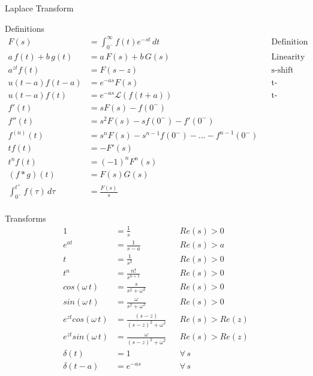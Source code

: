 %
%
%

\begin{section}{Laplace Transform}
  \begin{subsection}{Definitions}
    \begin{align*}
      F(s) &= \int_{0^-}^{\infty}f(t)e^{-st}\,dt  && \text{Definition}\\
      a\,f(t) + b\,g(t) &= a\,F(s) + b\,G(s)  && \text{Linearity}\\
      a^{zt}f(t)&= F(s-z) && \text{s-shift} \\
      u(t-a)f(t-a)&= e^{-as}F(s) && \text{t-translation I} \\
      u(t-a)f(t)&= e^{-as}\mathcal{L}(f(t+a)) && \text{t-translation II} \\
      f'(t) &= sF(s) - f(0^{-}) \\
      f''(t) &= s^{2}F(s) - sf(0^{-}) - f'(0^{-}) \\
      f^{(n)}(t) &= s^{n}F(s) - s^{n-1}f(0^{-}) - ... - f^{n-1}(0^{-}) \\
      tf(t) &= -F'(s) \\
      t^{n}f(t) &= (-1)^{n}F^{n}(s) \\
      (f*g)(t)&= F(s)G(s) \\
      \int_{0^-}^{t^+} f(\tau)\,d\tau &= \frac{F(s)}{s} \\
    \end{align*}
  \end{subsection}
  \begin{subsection}{Transforms}
    \begin{align*}
      1 &= \frac{1}{s} && Re(s) > 0\\
      e^{at} &= \frac{1}{s-a} && Re(s) > a\\
      t &= \frac{1}{s^2} && Re(s) > 0\\
      t^n &= \frac{n!}{s^{n+1}} && Re(s) > 0\\
      cos(\omega\,t) &= \frac{s}{s^2+\omega^2} && Re(s) > 0\\
      sin(\omega\,t) &= \frac{\omega}{s^2+\omega^2} && Re(s) > 0\\
      e^{zt}cos(\omega\,t) &= \frac{(s-z)}{(s-z)^2+\omega^2} && Re(s) > Re(z)\\
      e^{zt}sin(\omega\,t) &= \frac{\omega}{(s-z)^2+\omega^2} && Re(s) > Re(z)\\
      \delta(t) &= 1 && \forall\,s\\
      \delta(t-a) &= e^{-as} && \forall\,s\\

\end{align*}
\end{subsection}
\end{section}
